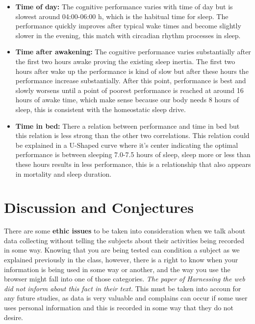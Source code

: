 \documentclass[]{IEEEtran}
\begin{document}
\begin{itemize}
    \item \textbf{Time of day:} The cognitive performance varies with time of day but is slowest around 04:00-06:00 h, which is the habitual time for sleep. The performance quickly improves after typical wake times and become slightly slower in the evening, this match with circadian rhythm processes in sleep.
    
    \item \textbf{Time after awakening:} The cognitive performance varies substantially after the first two hours awake proving the existing sleep inertia. The first two hours after wake up the performance is kind of slow but after these hours the performance increase substantially. After this point, performance is best and slowly worsens until a point of poorest performance is reached at around 16 hours of awake time, which make sense because our body needs 8 hours of sleep, this is consistent with the homeostatic sleep drive.
    
    \item \textbf{Time in bed:} There a relation between performance and time in bed but this relation is less strong than the other two correlations. This relation could be explained in a U-Shaped curve where it's center indicating the optimal performance is between sleeping 7.0-7.5 hours of sleep, sleep more or less than these hours results in less performance, this is a relationship that also appears in mortality and sleep duration.
    
\end{itemize}

\section{Discussion and Conjectures}

There are some \textbf{ethic issues} to be taken into consideration when we talk about data collecting without telling the subjects about their activities being recorded in some way. Knowing that you are being tested can condition a subject as we explained previously in the class, however, there is a right to know when your information is being used in some way or another, and the way you use the browser might fall into one of those categories. \textit{The paper of Harnessing the web did not inform about this fact in their text.} This must be taken into accoun for any future studies, as data is very valuable and complains can occur if some user uses personal information and this is recorded in some way that they do not desire. \par 
\end{document}
